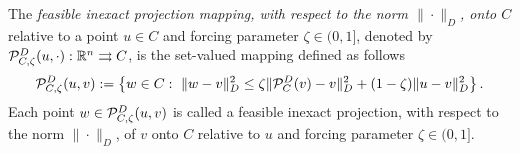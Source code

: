 \begin{definition} \label{def:InexactM}
	The {\it feasible inexact projection mapping, with respect to the norm $\| \cdot \|_{D}$,   onto $C$}  relative to a point  $u \in C$ and forcing parameter $\zeta\in (0, 1]$, denoted by ${\cal P}_{C,\zeta}^{D}(u,  \cdot): {\mathbb R}^n \rightrightarrows C$,  is the set-valued mapping defined as follows
	\begin{equation} \label{eq:Projwm}
		{\cal P}_{C,\zeta}^{D}(u, v) := \left\{w\in C:~ \|w-v\|_{D}^2\leq \zeta \| {\cal P}_{C}^{D}(v)-v\|_{D}^2+(1-\zeta)\|u-v\|_{D}^2 \right\}.
	\end{equation}
	Each point $w\in {\cal P}_{C,\zeta}^{D}(u, v) $ is called a  feasible inexact projection,  with respect to the norm $\| \cdot \|_{D}$,  of $v$ onto $C$ relative to $u$ and forcing parameter $\zeta\in (0, 1]$.
\end{definition}

